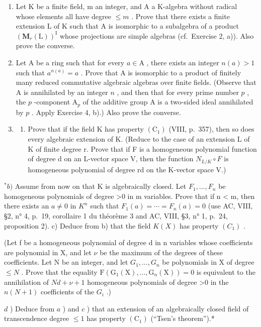 \begin{enumerate}
\def\labelenumi{\arabic{enumi})}
\setcounter{enumi}{4}
\item
  Let K be a finite field, m an integer, and A a K-algebra without radical whose elements all have degree \(\leqslant m\) . Prove that there exists a finite extension L of K such that A is isomorphic to a subalgebra of a product \((\mathbf{M}_{r}(\mathrm{L}))^{\mathrm{I}}\) whose projections are simple algebras (cf.~Exercise 2, a)). Also prove the converse.
\item
  Let A be a ring such that for every \(a \in \mathrm{A}\) , there exists an integer \(n(a) > 1\) such that \(a^{n(a)} = a\) . Prove that A is isomorphic to a product of finitely many reduced commutative algebraic algebras over finite fields. (Observe that A is annihilated by an integer \(n\) , and then that for every prime number \(p\) , the \(p\) -component \(\mathrm{A}_p\) of the additive group A is a two-sided ideal annihilated by \(p\) . Apply Exercise 4, b).) Also prove the converse.
\item
  \begin{enumerate}
  \def\labelenumii{\alph{enumii})}
  \tightlist
  \item
    Prove that if the field K has property \((\mathrm{C}_{1})\) (VIII, p.~357), then so does every algebraic extension of K. (Reduce to the case of an extension L of K of finite degree r. Prove that if F is a homogeneous polynomial function of degree d on an L-vector space V, then the function \(N_{L/K} \circ F\) is homogeneous polynomial of degree rd on the K-vector space V.)
  \end{enumerate}
\end{enumerate}

\(^{*}b)\) Assume from now on that K is algebraically closed. Let \(F_{1},\ldots,F_{n}\) be homogeneous polynomials of degree \textgreater0 in m variables. Prove that if n \textless{} m, then there exists an \(a \neq 0\) in \(K^{n}\) such that \(F_{1}(a) = \cdots = F_{n}(a) = 0\) (use AC, VIII, §2, n° 4, p.~19, corollaire 1 du théorème 3 and AC, VIII, §3, n° 1, p.~24, proposition 2). c) Deduce from b) that the field \(K(X)\) has property \((C_{1})\) .

(Let f be a homogeneous polynomial of degree d in n variables whose coefficients are polynomial in X, and let \(\nu\) be the maximum of the degrees of these coefficients. Let N be an integer, and let \(G_{1},\ldots,G_{n}\) be polynomials in X of degree \(\leqslant N\) . Prove that the equality \(\mathrm{F}(\mathrm{G}_{1}(\mathrm{X}),\ldots,\mathrm{G}_{n}(\mathrm{X}))=0\) is equivalent to the annihilation of \(Nd+\nu+1\) homogeneous polynomials of degree \textgreater0 in the \(n(N+1)\) coefficients of the \(G_{i}\) .)

\(d\) ) Deduce from \(a\) ) and \(c\) ) that an extension of an algebraically closed field of transcendence degree \(\leqslant 1\) has property \((\mathrm{C}_1)\) (``Tsen's theorem'').*

